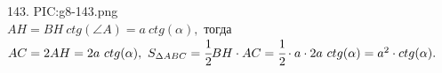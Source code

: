143. {{PIC:g8-143.png}}\\
$AH=BH\ ctg(\angle A)=a\ ctg(\alpha),$ тогда $AC=2AH=2a\ ctg(\alpha),\ S_{\Delta ABC}=\cfrac{1}{2}BH\cdot AC=\cfrac{1}{2}\cdot a \cdot2a\ ctg(\alpha)=a^2\cdot ctg(\alpha).$\newpage\noindent
